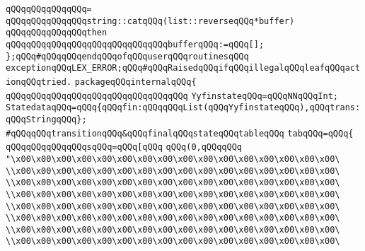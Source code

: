 \verb|qQQqqQQqqQQqqQQq=|\newline
\verb|qQQqqQQqqQQqqQQqstring::catqQQq(list::reverseqQQq*buffer)|\newline
\verb|qQQqqQQqqQQqqQQqthen|\newline
\verb|qQQqqQQqqQQqqQQqqQQqqQQqqQQqqQQqbufferqQQq:=qQQq[];|\newline
\newline
\verb|};qQQq#qQQqqQQqendqQQqofqQQquserqQQqroutinesqQQq|\newline
\verb|exceptionqQQqLEX_ERROR;qQQq#qQQqRaisedqQQqifqQQqillegalqQQqleafqQQqactionqQQqtried.|\newline
\verb|packageqQQqinternalqQQq{|\newline
\verb|qQQqqQQqqQQqqQQqqQQqqQQqqQQqqQQqqQQq|\newline
\newline
\verb|YyfinstateqQQq=qQQqNNqQQqInt;|\newline
\verb|StatedataqQQq=qQQq{qQQqfin:qQQqqQQqList(qQQqYyfinstateqQQq),qQQqtrans:qQQqStringqQQq};|\newline
\verb|#qQQqqQQqtransitionqQQq&qQQqfinalqQQqstateqQQqtableqQQq|\newline
\verb|tabqQQq=qQQq{|\newline
\verb|qQQqqQQqqQQqqQQqsqQQq=qQQq[qQQq|\newline
\verb|qQQq(0,qQQqqQQq|\newline
\verb|"\x00\x00\x00\x00\x00\x00\x00\x00\x00\x00\x00\x00\x00\x00\x00\x00\|\newline
\verb|\\x00\x00\x00\x00\x00\x00\x00\x00\x00\x00\x00\x00\x00\x00\x00\x00\|\newline
\verb|\\x00\x00\x00\x00\x00\x00\x00\x00\x00\x00\x00\x00\x00\x00\x00\x00\|\newline
\verb|\\x00\x00\x00\x00\x00\x00\x00\x00\x00\x00\x00\x00\x00\x00\x00\x00\|\newline
\verb|\\x00\x00\x00\x00\x00\x00\x00\x00\x00\x00\x00\x00\x00\x00\x00\x00\|\newline
\verb|\\x00\x00\x00\x00\x00\x00\x00\x00\x00\x00\x00\x00\x00\x00\x00\x00\|\newline
\verb|\\x00\x00\x00\x00\x00\x00\x00\x00\x00\x00\x00\x00\x00\x00\x00\x00\|\newline
\verb|\\x00\x00\x00\x00\x00\x00\x00\x00\x00\x00\x00\x00\x00\x00\x00\x00\|\newline
